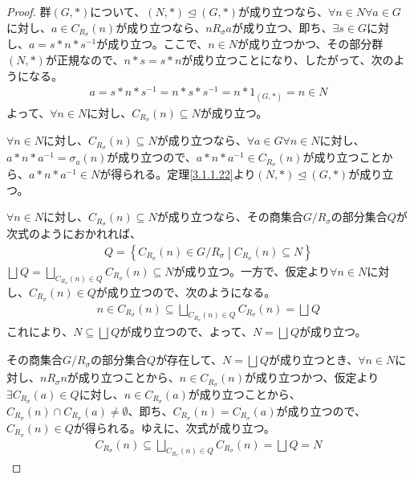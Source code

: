 \documentclass[dvipdfmx]{jsarticle}
\begin{document}
\begin{proof}
群$(G,*)$について、$(N,*) \trianglelefteq (G,*)$が成り立つなら、$\forall n \in N\forall a \in G$に対し、$a \in C_{R_{\sigma}}(n)$が成り立つなら、$nR_{\sigma}a$が成り立つ、即ち、$\exists s \in G$に対し、$a = s*n*s^{- 1}$が成り立つ。ここで、$n \in N$が成り立つかつ、その部分群$(N,*)$が正規なので、$n*s = s*n$が成り立つことになり、したがって、次のようになる。
\begin{align*}
a = s*n*s^{- 1} = n*s*s^{- 1} = n*1_{(G,*)} = n \in N
\end{align*}
よって、$\forall n \in N$に対し、$C_{R_{\sigma}}(n) \subseteq N$が成り立つ。\par
$\forall n \in N$に対し、$C_{R_{\sigma}}(n) \subseteq N$が成り立つなら、$\forall a \in G\forall n \in N$に対し、$a*n*a^{- 1} = \sigma_{a}(n)$が成り立つので、$a*n*a^{- 1} \in C_{R_{\sigma}}(n)$が成り立つことから、$a*n*a^{- 1} \in N$が得られる。定理\ref{3.1.1.22}より$(N,*) \trianglelefteq (G,*)$が成り立つ。\par
$\forall n \in N$に対し、$C_{R_{\sigma}}(n) \subseteq N$が成り立つなら、その商集合${G}/{R_{\sigma}}$の部分集合$Q$が次式のようにおかれれば、
\begin{align*}
Q = \left\{ C_{R_{\sigma}}(n) \in {G}/{R_{\sigma}} \middle| C_{R_{\sigma}}(n) \subseteq N \right\}
\end{align*}
$\bigsqcup_{} Q = \bigsqcup_{C_{R_{\sigma}}(n) \in Q} {C_{R_{\sigma}}(n)} \subseteq N$が成り立つ。一方で、仮定より$\forall n \in N$に対し、$C_{R_{\sigma}}(n) \in Q$が成り立つので、次のようになる。
\begin{align*}
n \in C_{R_{\sigma}}(n) \subseteq \bigsqcup_{C_{R_{\sigma}}(n) \in Q} {C_{R_{\sigma}}(n)} = \bigsqcup_{} Q
\end{align*}
これにより、$N \subseteq \bigsqcup_{} Q$が成り立つので、よって、$N = \bigsqcup_{} Q$が成り立つ。\par
その商集合${G}/{R_{\sigma}}$の部分集合$Q$が存在して、$N = \bigsqcup_{} Q$が成り立つとき、$\forall n \in N$に対し、$nR_{\sigma}n$が成り立つことから、$n \in C_{R_{\sigma}}(n)$が成り立つかつ、仮定より$\exists C_{R_{\sigma}}(a) \in Q$に対し、$n \in C_{R_{\sigma}}(a)$が成り立つことから、$C_{R_{\sigma}}(n) \cap C_{R_{\sigma}}(a) \neq \emptyset$、即ち、$C_{R_{\sigma}}(n) = C_{R_{\sigma}}(a)$が成り立つので、$C_{R_{\sigma}}(n) \in Q$が得られる。ゆえに、次式が成り立つ。
\begin{align*}
C_{R_{\sigma}}(n) \subseteq \bigsqcup_{C_{R_{\sigma}}(n) \in Q} {C_{R_{\sigma}}(n)} = \bigsqcup_{} Q = N
\end{align*}

\end{proof}
\end{document}
